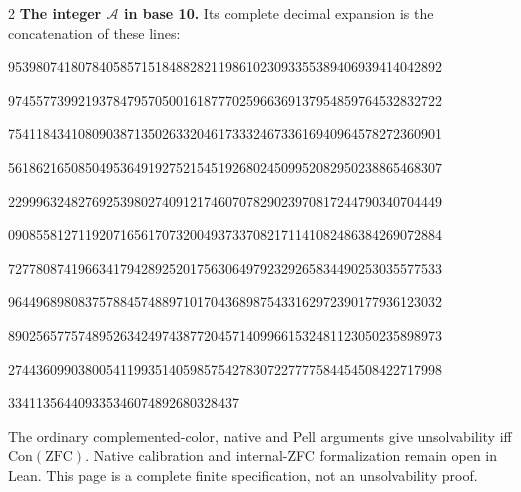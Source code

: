 \documentclass[10pt]{article}
\begin{document}
\begin{multicols}{2}
\textbf{The integer $\mathcal A$ in base 10.}
Its complete decimal expansion is the concatenation of these lines:\par
\begingroup\fontsize{7.7}{8.2}\selectfont{}\par
95398074180784058571518488282119861023093355389406939414042892\par
97455773992193784795705001618777025966369137954859764532832722\par
75411843410809038713502633204617333246733616940964578272360901\par
56186216508504953649192752154519268024509952082950238865468307\par
22999632482769253980274091217460707829023970817244790340704449\par
09085581271192071656170732004937337082171141082486384269072884\par
72778087419663417942892520175630649792329265834490253035577533\par
96449689808375788457488971017043689875433162972390177936123032\par
89025657757489526342497438772045714099661532481123050235898973\par
27443609903800541199351405985754278307227777584454508422717998\par
334113564409335346074892680328437\par
\endgroup
\normalfont\fontsize{7.7}{8.2}\selectfont
The ordinary complemented-color, native and Pell arguments give
unsolvability iff $\mathrm{Con}(\mathrm{ZFC})$.
Native calibration and internal-ZFC formalization remain open in Lean.
This page is a complete finite specification, not an unsolvability proof.
\end{multicols}
\end{document}
